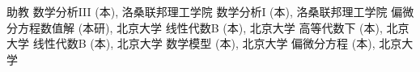 %
\begin{rubric}{\songti 助教}
%
\entry*[2022年秋季学期] 数学分析III (本), 洛桑联邦理工学院
%
\entry*[2021年秋季学期] 数学分析I (本), 洛桑联邦理工学院
%
\entry*[2019年秋季学期] 偏微分方程数值解 (本研), 北京大学
%
\entry*[2018年秋季学期] 线性代数B (本), 北京大学
%
\entry*[2018年春季学期] 高等代数下 (本), 北京大学
%
\entry*[2017年秋季学期] 线性代数B (本), 北京大学
%
\entry*[2017年春季学期] 数学模型 (本), 北京大学
%
\entry*[2016年秋季学期] 偏微分方程 (本), 北京大学
\end{rubric}

